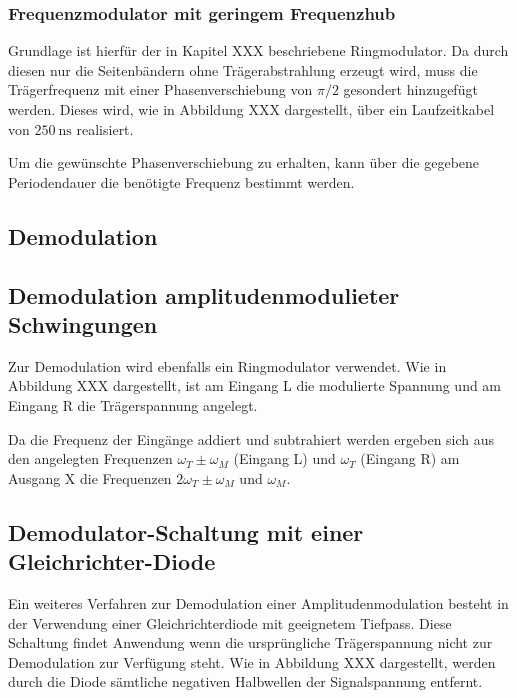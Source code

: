 \subsubsection{Frequenzmodulator mit geringem Frequenzhub}
Grundlage ist hierfür der in Kapitel XXX beschriebene Ringmodulator. Da durch diesen nur die Seitenbändern ohne Trägerabstrahlung erzeugt wird, muss die Trägerfrequenz mit einer Phasenverschiebung von $\pi/2$ gesondert hinzugefügt werden. Dieses wird, wie in Abbildung XXX dargestellt, über ein Laufzeitkabel von $\SI{250}{\ns}$ realisiert. 


Um die gewünschte Phasenverschiebung zu erhalten, kann über die gegebene Periodendauer die benötigte Frequenz bestimmt werden.

\subsection{Demodulation}

\subsection{Demodulation amplitudenmodulieter Schwingungen}
Zur Demodulation wird ebenfalls ein Ringmodulator verwendet. Wie in Abbildung XXX dargestellt, ist am Eingang L die modulierte Spannung und am Eingang R die Trägerspannung angelegt. 


Da die Frequenz der Eingänge addiert und subtrahiert werden ergeben sich aus den angelegten Frequenzen $\omega_T\pm\omega_M$ (Eingang L) und $\omega_T$ (Eingang R) am Ausgang X die Frequenzen $2\omega_T\pm\omega_M$ und $\omega_M$.

\subsection{Demodulator-Schaltung mit einer Gleichrichter-Diode}
Ein weiteres Verfahren zur Demodulation einer Amplitudenmodulation besteht in der Verwendung einer Gleichrichterdiode mit geeignetem Tiefpass. Diese Schaltung findet Anwendung wenn die ursprüngliche Trägerspannung nicht zur Demodulation zur Verfügung steht. Wie in Abbildung XXX dargestellt, werden durch die Diode sämtliche negativen Halbwellen der Signalspannung entfernt.

